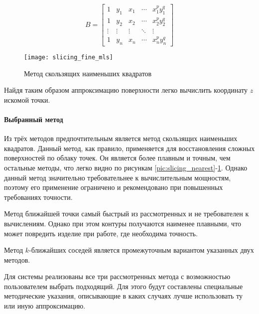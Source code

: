          \begin{equation}
             B = 
             \begin{bmatrix}
                 1 & y_1 & x_1 & \cdots & x_1^p y_1^q\\
                 1 & y_2 & x_2 & \cdots & x_2^p y_2^q\\
                 \vdots & \vdots & \vdots & \ddots & \vdots\\
                 1 & y_n & x_n & \cdots & x_n^p y_n^q
             \end{bmatrix}
         \end{equation}
         
         \begin{figure}[H]
             \centering
             \texttt{[image: slicing\_fine\_mls]}
             \caption{Метод скользящих наименьших квадратов}
             \label{pic:slicing_mls}
         \end{figure}
         
         Найдя таким образом аппроксимацию поверхности легко вычислить координату $ z $ искомой точки.
        
        \paragraph{Выбранный метод}
            Из трёх методов предпочтительным является метод скользящих наименьших квадратов. Данный метод, как правило, применяется для восстановления сложных поверхностей по облаку точек. Он является более плавным и точным, чем остальные методы, что легко видно по рисункам \ref{pic:slicing_nearest}-\ref{pic:slicing_mls}. Однако данный метод значительно требовательнее к вычислительным мощностям, поэтому его применение ограничено и рекомендовано при повышенных требованиях точности. 
            
            Метод ближайшей точки самый быстрый из рассмотренных и не требователен к вычислениям. Однако при этом контуры получаются наименее плавными, что может повредить изделие при работе, где необходима точность.
            
            Метод $ k $-ближайших соседей является промежуточным вариантом указанных двух методов.
            
            Для системы реализованы все три рассмотренных метода с возможностью пользователем выбрать подходящий. Для этого будут составлены специальные методические указания, описывающие в каких случаях лучше использовать ту или иную аппроксимацию.